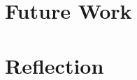 \documentclass{l4proj}
\begin{document}
\section{Future Work}
\section{Reflection}

























\begin{appendices}
\end{appendices}




\end{document}
